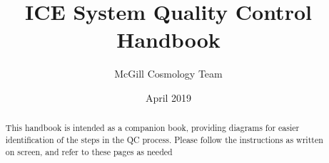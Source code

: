\documentclass[letterpaper,12pt,notitlepage]{article}
\title{ICE System Quality Control Handbook}
\author{McGill Cosmology Team}
\date{April 2019}
\begin{document}
\begin{titlingpage}
	\maketitle
	\begin{abstract}
		This handbook is intended as a companion book, providing diagrams for easier identification of the steps in the QC process. Please follow the instructions as written on screen, and refer to these pages as needed
	\end{abstract}
\end{titlingpage}



\tableofcontents






\end{document}
